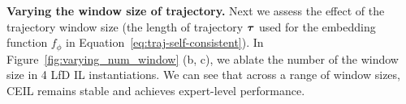 \textbf{Varying the window size of trajectory.} Next we assess the effect of the trajectory window size (\ie the length of trajectory ${\bm{\tau}}$ used for the embedding function $f_\phi$ in Equation~\ref{eq:traj-self-consistent}). In Figure~\ref{fig:varying_num_window} (b, c), we ablate the number of the window size in 4 LfD IL instantiations. We can see that across a range of window sizes, CEIL remains stable and achieves expert-level performance. 

 



